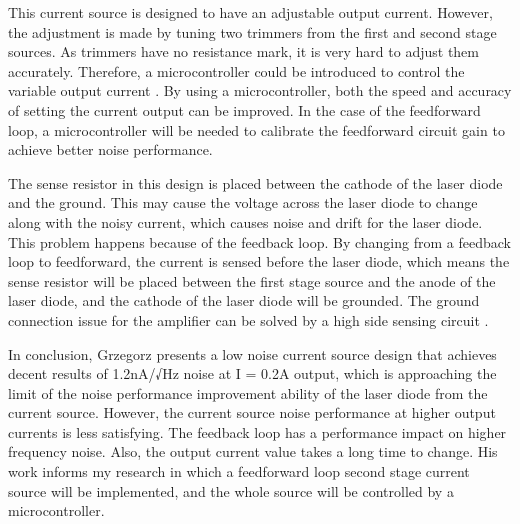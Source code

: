 This current source is designed to have an adjustable output current.  However, the adjustment is made by tuning two trimmers from the first and second stage sources.  As trimmers have no resistance mark, it is very hard to adjust them accurately.  Therefore, a microcontroller could be introduced to control the variable output current \cite{Du_2018}.  By using a microcontroller, both the speed and accuracy of setting the current output can be improved.  In the case of the feedforward loop, a microcontroller will be needed to calibrate the feedforward circuit gain to achieve better noise performance.

The sense resistor in this design is placed between the cathode of the laser diode and the ground.  This may cause the voltage across the laser diode to change along with the noisy current, which causes noise and drift for the laser diode.  This problem happens because of the feedback loop.  By changing from a feedback loop to feedforward, the current is sensed before the laser diode, which means the sense resistor will be placed between the first stage source and the anode of the laser diode, and the cathode of the laser diode will be grounded.  The ground connection issue for the amplifier can be solved by a high side sensing circuit \cite{TI_2019}.
 
In conclusion, Grzegorz presents a low noise current source design that achieves decent results of 1.2nA/√Hz noise at I = 0.2A output, which is approaching the limit of the noise performance improvement ability of the laser diode from the current source.  However, the current source noise performance at higher output currents is less satisfying.  The feedback loop has a performance impact on higher frequency noise.  Also, the output current value takes a long time to change.  His work informs my research in which a feedforward loop second stage current source will be implemented, and the whole source will be controlled by a microcontroller.



























 












